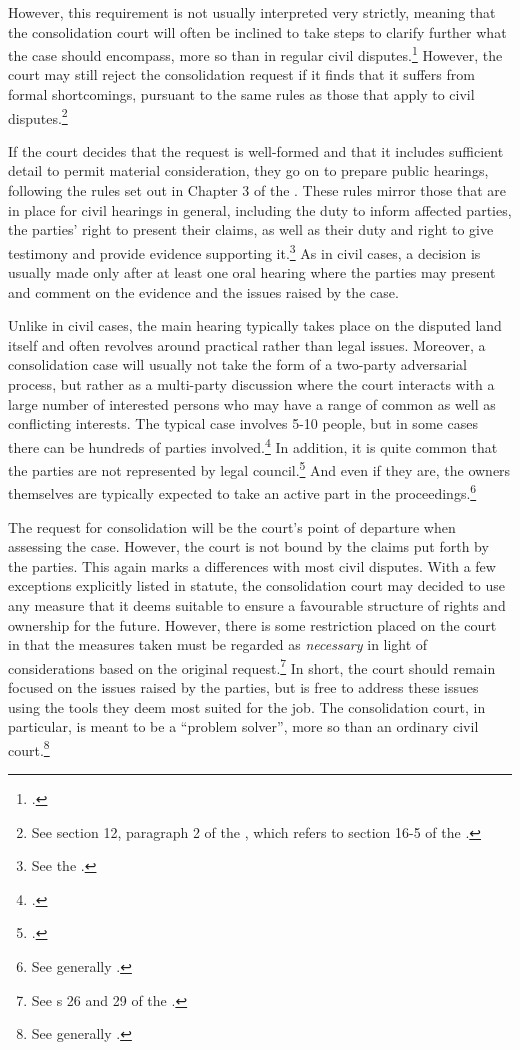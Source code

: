 However, this requirement is not usually interpreted very strictly, meaning that the consolidation court will often be inclined to take steps to clarify further what the case should encompass, more so than in regular civil disputes.\footcite[39]{langbach09} However, the court may still reject the consolidation request if it finds that it suffers from formal shortcomings, pursuant to the same rules as those that apply to civil disputes.\footnote{See section 12, paragraph 2 of the \cite{lca79}, which refers to section 16-5 of the \cite{cda05}.}

If the court decides that the request is well-formed and that it includes sufficient detail to permit material consideration, they go on to prepare public hearings, following the rules set out in Chapter 3 of the \cite{lca79}. These rules mirror those that are in place for civil hearings in general, including the duty to inform affected parties, the parties' right to present their claims, as well as their duty and right to give testimony and provide evidence supporting it.\footnote{See the \cite[13|15|17 a|18]{lca79}.} As in civil cases, a decision is usually made only after at least one oral hearing where the parties may present and comment on the evidence and the issues raised by the case.

Unlike in civil cases, the main hearing typically takes place on the disputed land itself and often revolves around practical rather than legal issues. Moreover, a consolidation case will usually not take the form of a two-party adversarial process, but rather as a multi-party discussion where the court interacts with a large number of interested persons who may have a range of common as well as conflicting interests. The typical case involves 5-10 people, but in some cases there can be hundreds of parties involved.\footcite[39]{langbach09} In addition, it is quite common that the parties are not represented by legal council.\footcite[109-111]{rognes00} And even if they are, the owners themselves are typically expected to take an active part in the proceedings.\footnote{See generally \cite{rognes00}.}

The request for consolidation will be the court's point of departure when assessing the case. However, the court is not bound by the claims put forth by the parties. This again marks a differences with most civil disputes. With a few exceptions explicitly listed in statute, the consolidation court may decided to use any measure that it deems suitable to ensure a favourable structure of rights and ownership for the future. However, there is some restriction placed on the court in that the measures taken must be regarded as \emph{necessary} in light of considerations based on the original request.\footnote{See s 26 and 29 of the \cite{lca79}.} In short, the court should remain focused on the issues raised by the parties, but is free to address these issues using the tools they deem most suited for the job. The consolidation court, in particular, is meant to be a ``problem solver'', more so than an ordinary civil court.\footnote{See generally \cite{rognes07}.}

